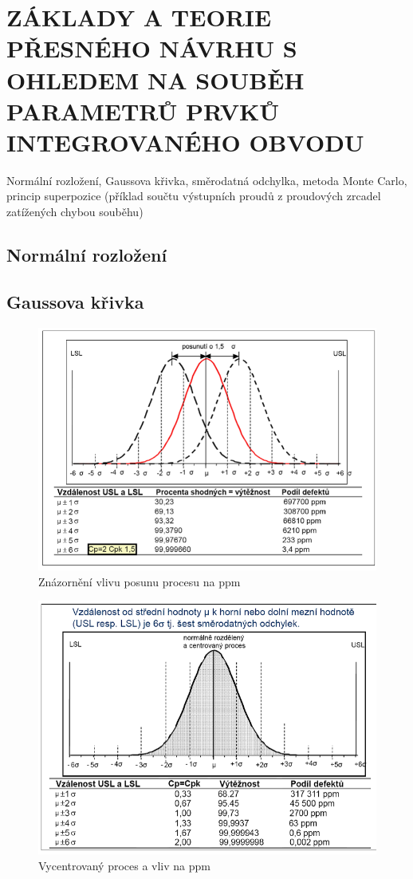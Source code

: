 \section{ZÁKLADY A TEORIE PŘESNÉHO NÁVRHU S OHLEDEM NA SOUBĚH PARAMETRŮ PRVKŮ INTEGROVANÉHO OBVODU}
Normální rozložení, Gaussova křivka, směrodatná odchylka, metoda Monte Carlo, princip superpozice (příklad součtu výstupních proudů z proudových zrcadel zatížených chybou souběhu)
\subsection{Normální rozložení}

\subsection{Gaussova křivka}
\begin{figure}[h]
   \begin{center}
     \includegraphics[scale=0.5]{images/Normal1.png}
   \end{center}
   \caption{Znázornění vlivu posunu procesu na ppm}
\end{figure}
\begin{figure}[h]
   \begin{center}
     \includegraphics[scale=0.5]{images/Normal2.png}
   \end{center}
   \caption{Vycentrovaný proces a vliv na ppm}
\end{figure}
